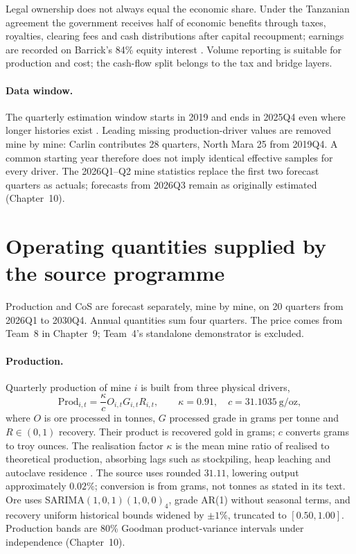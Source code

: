 Legal ownership does not always equal the economic share. Under the Tanzanian
agreement the government receives half of economic benefits through taxes,
royalties, clearing fees and cash distributions after capital recoupment;
earnings are recorded on Barrick's 84\% equity interest
\cite{barrick-ar-2025}. Volume reporting is suitable for production and cost;
the cash-flow split belongs to the tax and bridge layers.

\paragraph{Data window.}
The quarterly estimation window starts in 2019 and ends in 2025Q4 even where
longer histories exist \cite{team4}. Leading missing production-driver values
are removed mine by mine: Carlin contributes 28 quarters, North Mara 25 from
2019Q4. A common starting year therefore does not imply identical effective
samples for every driver. The 2026Q1--Q2 mine statistics replace the first
two forecast quarters as actuals; forecasts from 2026Q3 remain as originally
estimated (Chapter~10).

\section{Operating quantities supplied by the source programme}
\label{sec:company-operating-quantities}

Production and CoS are forecast separately, mine by mine, on 20 quarters
from 2026Q1 to 2030Q4. Annual quantities sum four quarters. The price comes
from Team~8 in Chapter~9; Team~4's standalone demonstrator is excluded.

\paragraph{Production.}
Quarterly production of mine $i$ is built from three physical drivers,
\begin{equation}
\mathrm{Prod}_{i,t}=\frac{\kappa}{c}O_{i,t}G_{i,t}R_{i,t},
\qquad\kappa=0.91,\quad c=31.1035~\text{g/oz},
\label{eq:company-production-identity}
\end{equation}
where $O$ is ore processed in tonnes, $G$ processed grade in grams per tonne
and $R\in(0,1)$ recovery. Their product is recovered gold in grams; $c$
converts grams to troy ounces. The realisation factor $\kappa$ is the mean
mine ratio of realised to theoretical production, absorbing lags such as
stockpiling, heap leaching and autoclave residence \cite{team4}. The source
uses rounded $31.11$, lowering output approximately $0.02\%$; conversion
is from grams, not tonnes as stated in its text. Ore uses
SARIMA$(1,0,1)(1,0,0)_4$, grade AR(1) without seasonal terms, and recovery
uniform historical bounds widened by $\pm1\%$, truncated to $[0.50,1.00]$.
Production bands are 80\% Goodman product-variance intervals under
independence (Chapter~10).

